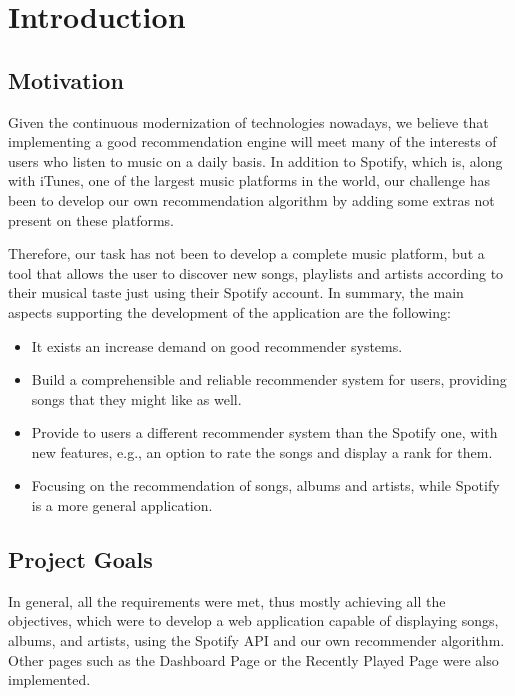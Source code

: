\chapter{Introduction}
\label{ch:Introduction}

\section{Motivation}

Given the continuous modernization of technologies nowadays, we believe that implementing a good recommendation engine will meet many of the interests of users who listen to music on a daily basis. In addition to Spotify, which is, along with iTunes, one of the largest music platforms in the world, our challenge has been to develop our own recommendation algorithm by adding some extras not present on these platforms.

Therefore, our task has not been to develop a complete music platform, but a tool that allows the user to discover new songs, playlists and artists according to their musical taste just using their Spotify account. In summary, the main aspects supporting the development of the application are the following:

\begin{itemize}
    \item It exists an increase demand on good recommender systems.
    \item Build a comprehensible and reliable recommender system for users, providing songs that they might like as well.
    \item Provide to users a different recommender system than the Spotify one, with new features, e.g., an option to rate the songs and display a rank for them.
    \item Focusing on the recommendation of songs, albums and artists, while Spotify is a more general application.
\end{itemize}

\section{Project Goals}

In general, all the requirements were met, thus mostly achieving all the objectives, which were to develop a web application capable of displaying songs, albums, and artists, using the Spotify API and our own recommender algorithm. Other pages such as the Dashboard Page or the Recently Played Page were also implemented.


